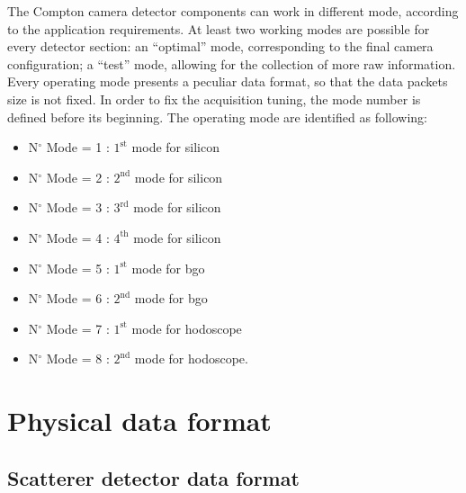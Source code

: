 The Compton camera detector components can work in different mode, according to the application requirements. At least two working modes are possible for every detector section: an \enquote{optimal} mode, corresponding to the final camera configuration; a \enquote{test} mode, allowing for the collection of more raw information. Every operating mode presents a peculiar data format, so that the data packets size is not fixed. In order to fix the acquisition tuning, the mode number is defined before its beginning.\newline
The operating mode are identified as following: \newline
\begin{itemize}
	\item N$^{\circ}$ Mode = 1 : $1^{\mathrm{st}}$ mode for silicon
	\item N$^{\circ}$ Mode = 2 : $2^{\mathrm{nd}}$ mode for silicon
	\item N$^{\circ}$ Mode = 3 : $3^{\mathrm{rd}}$ mode for silicon
	\item N$^{\circ}$ Mode = 4 : $4^{\mathrm{th}}$ mode for silicon
	\item N$^{\circ}$ Mode = 5 : $1^{\mathrm{st}}$ mode for \gls{bgo}
	\item N$^{\circ}$ Mode = 6 : $2^{\mathrm{nd}}$ mode for \gls{bgo}
	\item N$^{\circ}$ Mode = 7 : $1^{\mathrm{st}}$ mode for hodoscope
	\item N$^{\circ}$ Mode = 8 : $2^{\mathrm{nd}}$ mode for hodoscope.\newline
\end{itemize}



\section{Physical data format}\label{chapappA::sec::physDataFormat}



\subsection{Scatterer detector data format}\label{chapappA::subsec::scattDataFormat}


